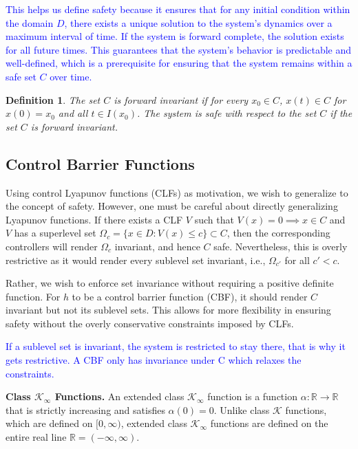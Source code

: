 \documentclass[12pt]{article}
\begin{document}
\textcolor{blue}{
This helps us define safety because it ensures that for any initial condition within the domain \( D \), there exists a unique solution to the system's dynamics over a maximum interval of time. If the system is forward complete, the solution exists for all future times. This guarantees that the system's behavior is predictable and well-defined, which is a prerequisite for ensuring that the system remains within a safe set \( C \) over time.
}

\newtheorem{definition}{Definition}

\begin{definition}
The set \( C \) is forward invariant if for every \( x_0 \in C \), \( x(t) \in C \) for \( x(0) = x_0 \) and all \( t \in I(x_0) \). The system is safe with respect to the set \( C \) if the set \( C \) is forward invariant.
\end{definition}

\subsection{Control Barrier Functions}
Using control Lyapunov functions (CLFs) as motivation, we wish to generalize to the concept of safety. However, one must be careful about directly generalizing Lyapunov functions. If there exists a CLF \( V \) such that \( V(x) = 0 \implies x \in C \) and \( V \) has a superlevel set \( \Omega_c = \{ x \in D : V(x) \leq c \} \subset C \), then the corresponding controllers will render \( \Omega_c \) invariant, and hence \( C \) safe. Nevertheless, this is overly restrictive as it would render every sublevel set invariant, i.e., \( \Omega_{c'} \) for all \( c' < c \). 

Rather, we wish to enforce set invariance without requiring a positive definite function. For \( h \) to be a control barrier function (CBF), it should render \( C \) invariant but not its sublevel sets. This allows for more flexibility in ensuring safety without the overly conservative constraints imposed by CLFs.

\textcolor{blue}{
If a sublevel set is invariant, the system is restricted to stay there, that is why it gets restrictive. A CBF only has invariance under C which relaxes the constraints.
}

\textbf{Class \( \mathcal{K}_\infty \) Functions.}
An extended class \( \mathcal{K}_\infty \) function is a function \( \alpha : \mathbb{R} \to \mathbb{R} \) that is strictly increasing and satisfies \( \alpha(0) = 0 \). Unlike class \( \mathcal{K} \) functions, which are defined on \([0, \infty)\), extended class \( \mathcal{K}_\infty \) functions are defined on the entire real line \(\mathbb{R} = (-\infty, \infty)\).
\end{document}
